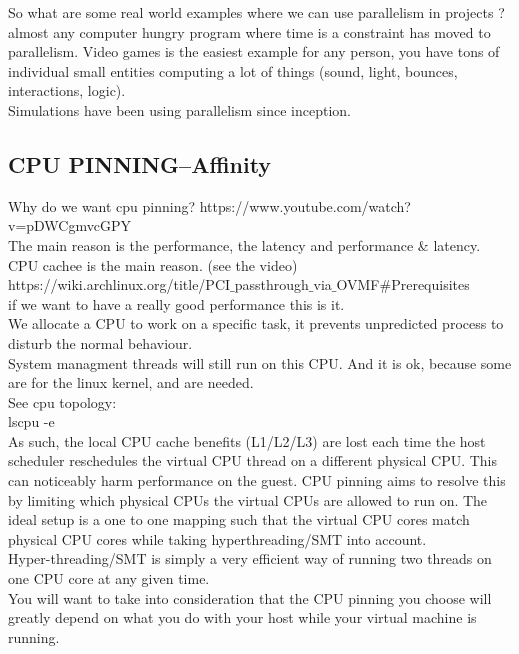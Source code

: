\documentclass[11pt, a4paper, oneside]{article}
\theoremstyle{definition}
\begin{document}
So what are some real world examples where we can use parallelism in projects ?\\
almost any computer hungry program where time is a constraint has moved to parallelism. Video games is the easiest example for any person, you have tons of individual small entities computing a lot of things (sound, light, bounces, interactions, logic).\\
Simulations have been using parallelism since inception.\\

\subsection{CPU PINNING--Affinity}
Why do we want cpu pinning? https://www.youtube.com/watch?v=pDWCgmvcGPY\\
The main reason is the performance, the latency and performance \& latency.\\
CPU cachee is the main reason. (see the video)\\


https://wiki.archlinux.org/title/PCI$\_$passthrough$\_$via$\_$OVMF$\#$Prerequisites\\

if we want to have a really good performance this is it.\\
We allocate a CPU to work on a specific task, it prevents unpredicted process to disturb the normal behaviour.\\
System managment threads will still run on this CPU. And it is ok, because some are for the linux kernel, and are needed.\\

See cpu topology:\\
lscpu -e\\

As such, the local CPU cache benefits (L1/L2/L3) are lost each time the host scheduler reschedules the virtual CPU thread on a different physical CPU. This can noticeably harm performance on the guest. CPU pinning aims to resolve this by limiting which physical CPUs the virtual CPUs are allowed to run on. The ideal setup is a one to one mapping such that the virtual CPU cores match physical CPU cores while taking hyperthreading/SMT into account. \\

Hyper-threading/SMT is simply a very efficient way of running two threads on one CPU core at any given time.\\
You will want to take into consideration that the CPU pinning you choose will greatly depend on what you do with your host while your virtual machine is running. \\
\end{document}
